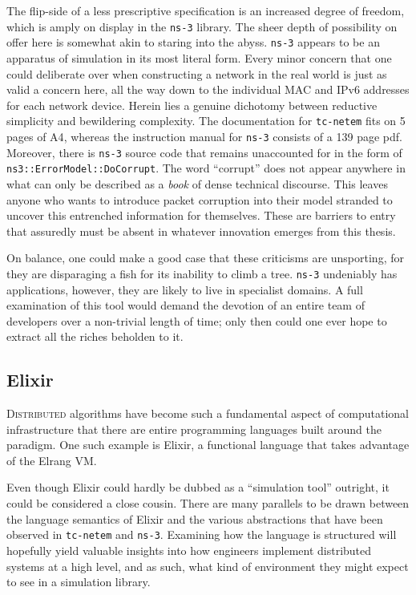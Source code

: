 The flip-side of a less prescriptive specification is an increased degree of freedom, which is amply on display in
the \texttt{ns-3} library. The sheer depth of possibility on offer here is somewhat akin to staring into the abyss.
\texttt{ns-3} appears to be an apparatus of simulation in its most literal form. Every minor concern that one could
deliberate over when constructing a network in the real world is just as valid a concern here, all the way down to
the individual MAC and IPv6 addresses for each network device. Herein lies a genuine dichotomy between reductive
simplicity and bewildering complexity. The documentation for \texttt{tc-netem} fits on 5 pages of
A4\cite{tc_netem_8_man}, whereas the instruction manual for \texttt{ns-3} consists of a 139 page pdf\cite{ns_3_man_pdf}.
Moreover, there is \texttt{ns-3} source code that remains unaccounted for in the form of
\texttt{ns3::ErrorModel::DoCorrupt}. The word ``corrupt'' does not appear anywhere in what can only be described as
a \emph{book} of dense technical discourse. This leaves anyone who wants to introduce packet corruption into their
model stranded to uncover this entrenched information for themselves. These are barriers to entry that assuredly must
be absent in whatever innovation emerges from this thesis.

On balance, one could make a good case that these criticisms are unsporting, for they are disparaging a fish for its
inability to climb a tree\cite{einstein_quotes}. \texttt{ns-3} undeniably has applications, however, they are likely
to live in specialist domains. A full examination of this tool would demand the devotion of an entire team of
developers over a non-trivial length of time; only then could one ever hope to extract all the riches beholden to it.

\subsection{Elixir}\label{subsection:elixir}

\lettrine{D}{istributed} algorithms have become such a fundamental aspect of computational infrastructure that there
are entire programming languages built around the paradigm. One such example is Elixir, a functional language that
takes advantage of the Elrang VM\cite{elixir, erlang}.

Even though Elixir could hardly be dubbed as a ``simulation tool'' outright, it could be considered a close cousin.
There are many parallels to be drawn between the language semantics of Elixir and the various abstractions that
have been observed in \texttt{tc-netem} and \texttt{ns-3}. Examining how the language is structured will hopefully
yield valuable insights into how engineers implement distributed systems at a high level, and as such, what kind of
environment they might expect to see in a simulation library.

